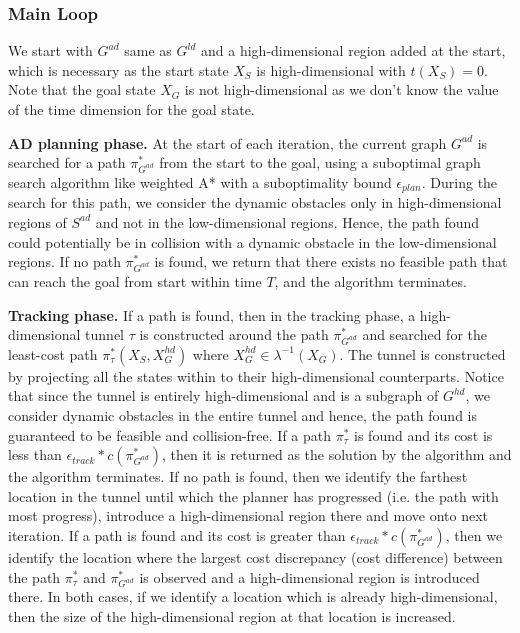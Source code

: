 \subsubsection{Main Loop}
We start with $G^{ad}$ same as $G^{ld}$ and a high-dimensional region added at the start, which is necessary as the start state $X_S$ is high-dimensional with $t(X_S) = 0$. Note that the goal state $X_G$ is not high-dimensional as we don't know the value of the time dimension for the goal state. 

{\bf AD planning phase.} At the start of each iteration, the current graph $G^{ad}$ is searched for a path $\pi_{G^{ad}}^*$ from the start to the goal, using a suboptimal graph search algorithm like weighted A* with a suboptimality bound $\epsilon_{plan}$. During the search for this path, we consider the dynamic obstacles only in high-dimensional regions of $S^{ad}$ and not in the low-dimensional regions. Hence, the path found could potentially be in collision with a dynamic obstacle in the low-dimensional regions. If no path $\pi_{G^{ad}}^*$ is found, we return that there exists no feasible path that can reach the goal from start within time $T$, and the algorithm terminates.

{\bf Tracking phase.} If a path is found, then in the tracking phase, a high-dimensional tunnel $\tau$ is constructed around the path $\pi_{G^{ad}}^*$ and searched for the least-cost path $\pi_\tau^*(X_S, X_G^{hd})$ where $X_G^{hd} \in \lambda^{-1}(X_G)$. The tunnel is constructed by projecting all the states within to their high-dimensional counterparts. Notice that since the tunnel is entirely high-dimensional and is a subgraph of $G^{hd}$, we consider dynamic obstacles in the entire tunnel and hence, the path found is guaranteed to be feasible and collision-free. If a path $\pi_\tau^*$ is found and its cost is less than $\epsilon_{track}*c(\pi_{G^{ad}}^*)$, then it is returned as the solution by the algorithm and the algorithm terminates. If no path is found, then we identify the farthest location in the tunnel until which the planner has progressed (i.e. the path with most progress), introduce a high-dimensional region there and move onto next iteration. If a path is found and its cost is greater than $\epsilon_{track}*c(\pi_{G^{ad}}^*)$, then we identify the location where the largest cost discrepancy (cost difference) between the path $\pi_\tau^*$ and $\pi_{G^{ad}}^*$ is observed and a high-dimensional region is introduced there. In both cases, if we identify a location which is already high-dimensional, then the size of the high-dimensional region at that location is increased.

